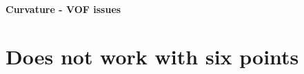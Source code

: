 \documentclass[11pt,a4paper]{article}
\begin{document}
{\Huge \bf Curvature - VOF issues}
\titlepage
\mbox{}

\section{Does not work with six points}

\newpage
\end{document}
